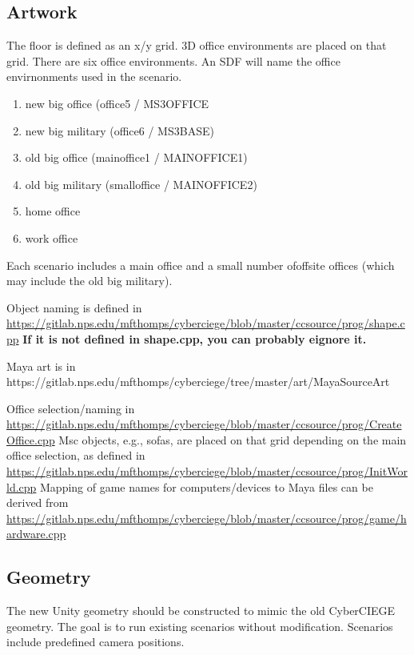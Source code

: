 \documentclass{article}
\begin{document}
\subsection {Artwork}
The floor is defined as an x/y grid.
3D office environments are placed on that grid.
There are six office environments.  An SDF will name the office envirnonments used in the scenario. 
\begin{enumerate}
\item new big office (office5 / MS3OFFICE
\item new big military (office6 / MS3BASE)
\item old big office (mainoffice1 / MAINOFFICE1)
\item old big military (smalloffice / MAINOFFICE2)
\item home office 
\item work office 
\end{enumerate}

Each scenario includes a main office and a small number ofoffsite offices (which may include the old big military).

Object naming is defined in \linebreak \url{https://gitlab.nps.edu/mfthomps/cyberciege/blob/master/ccsource/prog/shape.cpp}
\linebreak
\textbf{If it is not defined in shape.cpp, you can probably eignore it.}

Maya art is in https://gitlab.nps.edu/mfthomps/cyberciege/tree/master/art/MayaSourceArt

Office selection/naming in \linebreak 
\url{https://gitlab.nps.edu/mfthomps/cyberciege/blob/master/ccsource/prog/CreateOffice.cpp}
\linebreak
Msc objects, e.g., sofas, are placed on that grid depending on the main office selection, as defined
in  \linebreak \url{https://gitlab.nps.edu/mfthomps/cyberciege/blob/master/ccsource/prog/InitWorld.cpp}
\linebreak
Mapping of game names for computers/devices to Maya files can be derived from 
\linebreak
\url{https://gitlab.nps.edu/mfthomps/cyberciege/blob/master/ccsource/prog/game/hardware.cpp}

\subsection{Geometry}
The new Unity geometry should be constructed to mimic the old CyberCIEGE geometry. The goal is to
run existing scenarios without modification.  Scenarios include predefined camera positions.
\end{document}
